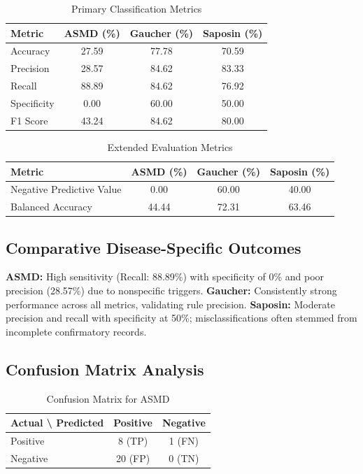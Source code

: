 \begin{table}[H]
\centering
\caption{Primary Classification Metrics}
\label{tab:primary}
\begin{tabular}{lccc}
\toprule
\textbf{Metric} & \textbf{ASMD (\%)} & \textbf{Gaucher (\%)} & \textbf{Saposin (\%)} \\
\midrule
Accuracy & 27.59 & 77.78 & 70.59 \\
Precision & 28.57 & 84.62 & 83.33 \\
Recall & 88.89 & 84.62 & 76.92 \\
Specificity & 0.00 & 60.00 & 50.00 \\
F1 Score & 43.24 & 84.62 & 80.00 \\
\bottomrule
\end{tabular}
\end{table}

\begin{table}[H]
\centering
\caption{Extended Evaluation Metrics}
\label{tab:extended}
\begin{tabular}{lccc}
\toprule
\textbf{Metric} & \textbf{ASMD (\%)} & \textbf{Gaucher (\%)} & \textbf{Saposin (\%)} \\
\midrule
Negative Predictive Value & 0.00 & 60.00 & 40.00 \\
Balanced Accuracy & 44.44 & 72.31 & 63.46 \\
\bottomrule
\end{tabular}
\end{table}

\subsection{Comparative Disease-Specific Outcomes}

\textbf{ASMD:} High sensitivity (Recall: 88.89\%) with specificity of 0\% and poor precision (28.57\%) due to nonspecific triggers.  
\textbf{Gaucher:} Consistently strong performance across all metrics, validating rule precision.  
\textbf{Saposin:} Moderate precision and recall with specificity at 50\%; misclassifications often stemmed from incomplete confirmatory records.

\subsection{Confusion Matrix Analysis}

\begin{table}[H]
\centering
\caption{Confusion Matrix for ASMD}
\begin{tabular}{lcc}
\toprule
\textbf{Actual \textbackslash{} Predicted} & Positive & Negative \\
\midrule
Positive & 8 (TP) & 1 (FN) \\
Negative & 20 (FP) & 0 (TN) \\
\bottomrule
\end{tabular}
\end{table}

